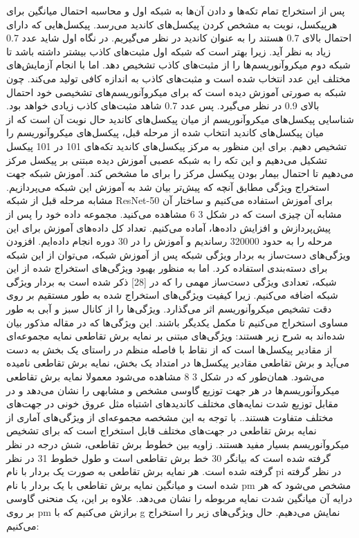 پس از استخراج تمام تکه‌ها و دادن آن‌ها به شبکه اول و محاسبه احتمال میانگین برای هرپیکسل، نوبت به مشخص کردن پیکسل‌های کاندید می‌رسد. پیکسل‌هایی که دارای احتمال بالای 0.7 هستند را به عنوان کاندید در نظر می‌گیریم. 
در نگاه اول شاید عدد 0.7 زیاد به نظر آید. زیرا بهتر است که شبکه اول مثبت‌های کاذب بیشتر داشته باشد تا شبکه دوم میکروآنوریسم‌ها را از مثبت‌های کاذب تشخیص دهد. اما با انجام آزمایش‌های مختلف این عدد انتخاب شده است و مثبت‌های کاذب به اندازه کافی تولید می‌کند. چون شبکه به صورتی آموزش دیده است که برای میکروآنوریسم‌های تشخیصی خود احتمال بالای 0.9 در نظر می‌گیرد. پس عدد 0.7 شاهد مثبت‌های کاذب زیادی خواهد بود.
	شناسایی پیکسل‌های میکروآنوریسم از میان پیکسل‌های کاندید
حال نوبت آن است که از میان پیکسل‌های کاندید انتخاب شده از مرحله قبل، پیکسل‌های میکروآنوریسم را تشخیص دهیم. برای این منظور به مرکز پیکسل‌های کاندید تکه‌های 101 در 101 پیکسل تشکیل می‌دهیم و این تکه را به شبکه عصبی آموزش دیده مبتنی بر پیکسل مرکز می‌دهیم تا احتمال بیمار بودن پیکسل مرکز را برای ما مشخص کند.
	آموزش شبکه جهت استخراج ویژگی
مطابق آنچه که پیش‌تر بیان شد به آموزش این شبکه می‌پردازیم. مشابه مرحله قبل از شبکه ResNet-50 برای آموزش استفاده می‌کنیم و ساختار آن مشابه آن چیزی است که در شکل ‏3 6 مشاهده می‌کنید. مجموعه داده خود را پس از پیش‌پردازش و افزایش‌ داده‌ها، آماده می‌کنیم. تعداد کل داده‌های آموزش برای این مرحله را به حدود 320000 رساندیم و آموزش را در 30 دوره انجام داده‌ایم.
	افزودن ویژگی‌های دست‌ساز به بردار ویژگی شبکه
پس از آموزش شبکه، می‌توان از این شبکه برای دسته‌بندی استفاده کرد. اما به منظور بهبود ویژگی‌های استخراج شده از این شبکه، تعدادی ویژگی دست‌ساز مهمی را که در [28] ذکر شده است به بردار ویژگی شبکه اضافه می‌کنیم. زیرا کیفیت ویژگی‌های استخراج شده به طور مستقیم بر روی دقت تشخیص میکروآنوریسم اثر می‌گذارد. ویژگی‌ها را از کانال سبز و آبی به طور مساوی استخراج ‌می‌کنیم تا مکمل یکدیگر باشند. این ویژگی‌ها که در مقاله مذکور بیان شده‌اند به شرح زیر هستند:
	ویژگی‌های مبتنی بر نمایه برش تقاطعی  
نمایه مجموعه‌ای از مقادیر پیکسل‌ها است که از نقاط با فاصله منظم در راستای یک بخش به ‌دست می‌آید و برش تقاطعی مقادیر پیکسل‌ها در امتداد یک بخش، نمایه برش تقاطعی نامیده‌ می‌شود. همان‌طور که در شکل ‏3 8 مشاهده می‌شود معمولا نمایه برش تقاطعی میکروآنوریسم‌ها در هر جهت توزیع گاوسی مشخص و مشابهی را نشان می‌دهد و در مقابل توزیع شدت نمایه‌های مختلف کاندید‌های اشتباه مثل عروق خونی در جهت‌های مختلف متفاوت هستند.. با توجه به این مشخصه مجموعه‌ای از ویژگی‌های آماری از نمایه برش تقاطعی در جهت‌های مختلف قابل استخراج است که برای تشخیص میکروآنوریسم بسیار مفید هستند.
زاویه بین خطوط برش تقاطعی، شش درجه در نظر گرفته شده است که بیانگر 30 خط برش تقاطعی است و طول خطوط 31 در نظر گرفته شده است. هر نمایه برش تقاطعی به صورت یک بردار با نام pi در نظر گرفته شده است و میانگین نمایه برش تقاطعی با یک بردار با نام pm مشخص می‌شود که هر درایه آن میانگین شدت نمایه مربوطه را نشان می‌دهد. علاوه بر این، یک منحنی گاوسی بر روی pm برازش می‌کنیم که با g نمایش می‌دهیم. حال ویژگی‌های زیر را استخراج می‌کنیم:

